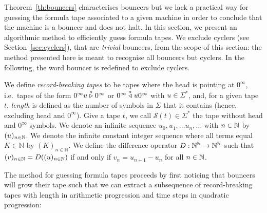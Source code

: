 Theorem~\ref{th:bouncers} characterises bouncers but we lack a practical way for guessing the formula tape associated to a given machine in order to conclude that the machine is a bouncer and does not halt. In this section, we present an algorithmic method to efficiently guess formula tapes. We exclude cyclers (see Section~\ref{sec:cyclers}), that are \textit{trivial} bouncers, from the scope of this section: the method presented here is meant to recognise all bouncers but cyclers. In the following, the word bouncer is redefined to exclude cyclers.

We define \textit{record-breaking tapes} to be tapes where the head is pointing at $0^\infty$, i.e.\ tapes of the form $0^\infty u \stackrel{s}\triangleright 0^\infty$ or $0^\infty \stackrel{s}\triangleleft u 0^\infty$ with $u\in\Sigma^*$, and, for a given tape $t$, \textit{length} is defined as the number of symbols in $\Sigma$ that it contains (hence, excluding head and $0^\infty$). Give a tape $t$, we call $\mathcal{S}(t) \in \Sigma^*$ the tape without head and $0^\infty$ symbols. We denote an infinite sequence $u_0, u_1, \dots u_n, \dots$ with $n\in\mathbb{N}$ by $(u)_{n\in\mathbb{N}}$. We denote the infinite constant integer sequence where all terms equal $K\in\mathbb{N}$ by $(K)_{n\in\mathbb{N}}$. We define the difference operator $D: \mathbb{N}^{\mathbb{N}} \to \mathbb{N}^{\mathbb{N}}$ such that $(v)_{n\in\mathbb{N}} = D((u)_{n\in\mathbb{N}})$ if and only if $v_n = u_{n+1}-u_{n}$ for all $n\in\mathbb{N}$.

The method for guessing formula tapes proceeds by first noticing that bouncers will grow their tape such that we can extract a subsequence of record-breaking tapes with length in arithmetic progression and time steps in quadratic progression:

